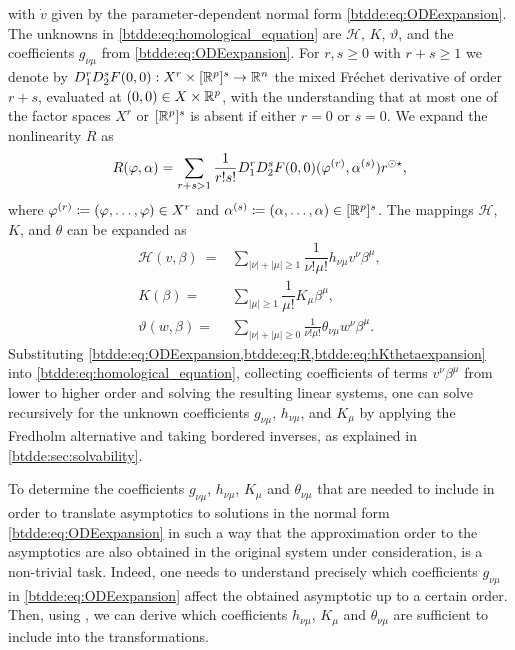 with $\dot{v}$ given by the parameter-dependent normal form
\cref{btdde:eq:ODEexpansion}. The unknowns in \cref{btdde:eq:homological_equation} are
$\mathcal{H}$, $K$, $\vartheta$, and the coefficients $g_{\nu\mu}$ from
\cref{btdde:eq:ODEexpansion}. For $r, s \ge 0$ with $r + s \ge 1$ we denote by
$D_1^rD_2^sF(0,0) : X^r \times [\mathbb{R}^p]^s \rightarrow \mathbb{R}^n$ the mixed Fr\'echet
derivative of order $r + s$, evaluated at $(0,0) \in X \times \mathbb{R}^p$, with the
understanding that at most one of the factor spaces $X^r$ or $[\mathbb{R}^p]^s$ is
absent if either $r = 0$ or $s = 0$. We expand the nonlinearity $R$ as
\begin{equation}
  \label{btdde:eq:R}
  R(\varphi,\alpha) = \sum_{r + s > 1}\frac{1}{r!s!}D_1^rD_2^sF(0,0)(\varphi^{(r)},\alpha^{(s)})r^{\odot\star},
\end{equation}
where $\varphi^{(r)} \coloneqq (\varphi,\dots,\varphi)\in X^r$ and $\alpha^{(s)} \coloneqq
(\alpha,\dots,\alpha)\in [\mathbb{R}^p]^s$. The mappings $\mathcal{H}$, $K$, and
$\theta$ can be expanded as
\begin{equation}
\label{btdde:eq:hKthetaexpansion}
\begin{aligned}
    \mathcal{H}(v,\beta)\ ={}& \sum_{|\nu| + |\mu| \geq 1}\dfrac{1}{\nu!\mu!}h_{\nu\mu}v^{\nu}\beta^{\mu}, \\
    K(\beta) ={}& \sum_{|\mu| \geq 1}\dfrac{1}{\mu!}K_{\mu}\beta^{\mu}, \\
    \vartheta(w, \beta) ={}& \sum_{|\nu|+|\mu| \geq 0} \frac1{\nu!\mu!} \theta_{\nu\mu} w^\nu \beta^\mu.
\end{aligned}
\end{equation}
Substituting \cref{btdde:eq:ODEexpansion,btdde:eq:R,btdde:eq:hKthetaexpansion} into
\cref{btdde:eq:homological_equation}, collecting coefficients of terms
$v^{\nu}\beta^{\mu}$ from lower to higher order and solving the resulting
linear systems, one can solve recursively for the unknown coefficients
$g_{\nu\mu}$, $h_{\nu\mu}$, and $K_{\mu}$ by applying the Fredholm alternative
and taking bordered inverses, as explained in \cref{btdde:sec:solvability}.

\begin{remark}
To determine the coefficients $g_{\nu\mu}$, $h_{\nu\mu}$, $K_{\mu}$ and
$\theta_{\nu\mu}$ that are needed to include in order to translate asymptotics
to solutions in the normal form \cref{btdde:eq:ODEexpansion} in such a way that
the approximation order to the asymptotics are also obtained in the original
system under consideration, is a non-trivial task. Indeed, one needs to
understand precisely which coefficients $g_{\nu\mu}$ in
\cref{btdde:eq:ODEexpansion} affect the obtained asymptotic up to a certain
order. Then, using \cite[Proposition 1]{Bosschaert@Interplay}, we can derive
which coefficients $h_{\nu\mu}$, $K_{\mu}$ and $\theta_{\nu\mu}$ are sufficient
to include into the transformations.
\end{remark}

